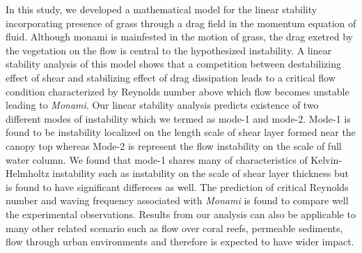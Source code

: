 \documentclass[12pt]{report}   %
\begin{document}
\newline
In this study, we developed a mathematical model for the linear stability incorporating presence of grass through a drag field in the momentum equation of fluid. Although monami is mainfested in the motion of grass, the drag exetred by the vegetation on the flow is central to the hypothesized instability. A linear stability analysis of this model shows that a competition between destabilizing effect of shear and stabilizing effect of drag dissipation leads to a critical flow condition characterized by Reynolds number above which flow becomes unstable leading to \textit{Monami}. Our linear stability analysis predicts existence of two different modes of instability which we termed as mode-1 and mode-2. Mode-1 is found to be instability localized on the length scale of shear layer formed near the canopy top whereas Mode-2 is represent the flow instability on the scale of full water column. We found that mode-1 shares many of characteristics of Kelvin-Helmholtz instability such as instability on the scale of 
shear layer thickness but is found to have significant differeces as well. The prediction of critical Reynolds number and waving frequency associated with \textit{Monami} is found to compare well the experimental observations. Results from our analysis can also be applicable to many other related scenario such as flow over coral reefs, permeable sediments, flow through urban environments and therefore is expected to have wider impact. 

%
\clearpage{\pagestyle{empty}\cleardoublepage}
\end{document}
